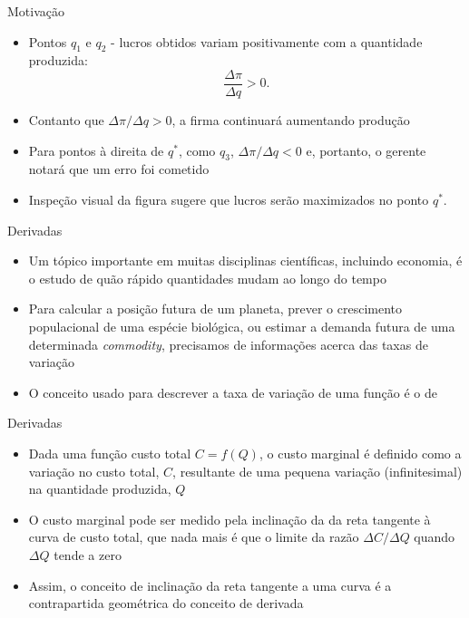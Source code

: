 \documentclass[10pt]{beamer}
\begin{document}
\begin{frame}
    {Motivação}
    \begin{itemize}
        \item Pontos $q_1$ e $q_2$ - lucros obtidos variam positivamente com a quantidade produzida:
        \[
            \frac{\Delta \pi}{\Delta q} > 0.
        \] \bigskip
        \item Contanto que $\Delta \pi/\Delta q > 0$, a firma continuará aumentando produção \bigskip
        \item Para pontos à direita de $q^*$, como $q_3$, $\Delta \pi/\Delta q < 0$ e, portanto, o gerente notará que um erro foi cometido \bigskip
        \item Inspeção visual da figura sugere que lucros serão maximizados no ponto $q^*$.
    \end{itemize}
\end{frame}

\begin{frame}
    {Derivadas}
    \begin{itemize}
        \item Um tópico importante em muitas disciplinas científicas, incluindo economia, é o estudo de quão rápido quantidades mudam ao longo do tempo\bigskip
        \item Para calcular a posição futura de um planeta, prever o crescimento populacional de uma espécie biológica, ou estimar a demanda futura de uma determinada \emph{commodity}, precisamos de informações acerca das taxas de variação \bigskip
        \item O conceito usado para descrever a taxa de variação de uma função é o de 
    \end{itemize}
\end{frame}

\begin{frame}
    {Derivadas}
    \begin{itemize}
        \item Dada uma função custo total $C = f(Q)$, o custo marginal é definido como a variação no custo total, $C$, resultante de uma pequena variação (infinitesimal) na quantidade produzida, $Q$ \bigskip
        \item O custo marginal pode ser medido pela inclinação da da reta tangente à curva de custo total, que nada mais é que o limite da razão $\Delta C/\Delta Q$ quando $\Delta Q$ tende a zero\bigskip
        \item Assim, o conceito de inclinação da reta tangente a uma curva é a contrapartida geométrica do conceito de derivada
    \end{itemize}
\end{frame}
\end{document}
